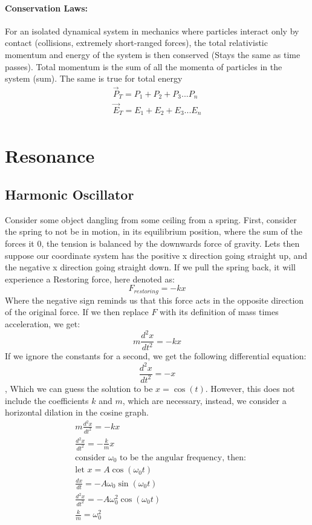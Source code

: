 \documentclass[10pt]{report}
\begin{document}
{\subsubsection{Conservation Laws:}
\par{For an isolated dynamical system in mechanics where particles interact only by contact (collisions, extremely short-ranged forces), the total relativistic momentum and energy of the system is then conserved (Stays the same as time passes). Total momentum is the sum of all the momenta of particles in the system (sum). The same is true for total energy}
\begin{align*}
	\vec{P}_{T}=P_{1}+P_{2}+P_{3}...P_{n} \\
	\vec{E}_{T}=E_{1}+E_{2}+E_{3}...E_{n} \\
\end{align*}

\chapter{Resonance}
\section{Harmonic Oscillator}
\par{Consider some object dangling from some ceiling from a spring. First, consider the spring to not be in motion, in its equilibrium position, where the sum of the forces it 0, the tension is balanced by the downwards force of gravity. Lets then suppose our coordinate system has the positive x direction going straight up, and the negative x direction going straight down. If we pull the spring back, it will experience a Restoring force, here denoted as: \[
F_{restoring}=-kx
\]
Where the negative sign reminds us that this force acts in the opposite direction of the original force. If we then replace $F$ with its definition of mass times acceleration, we get:  \[
m\frac{d^{2}x}{dt^{2}}=-kx
\] If we ignore the constants for a second, we get the following differential equation: \[
\frac{d^{2}x}{dt^{2}}=-x
\], Which we can guess the solution to be $x=\cos\left(t\right)$. However, this does not include the coefficients $k$ and $m$, which are necessary, instead, we consider a horizontal dilation in the cosine graph.
\begin{align*}
	& m\frac{d^{2}x}{dt^{2}}=-kx \\
	& \frac{d^{2}x}{dt^{2}}=-\frac{k}{m}x \\
	& \text{consider $\omega_{0}$ to be the angular frequency, then:} \\
	& \text{let } x=A\cos\left(\omega_{0}t\right) \\
	& \frac{dx}{dt}=-A\omega_{0}\sin\left(\omega_{0}t\right) \\
	& \frac{d^{2}x}{dt^{2}}=-A\omega_{0}^{2}\cos\left(\omega_{0}t\right) \\
	& \frac{k}{m}=\omega_{0}^{2}
\end{align*}

}}
\end{document}
